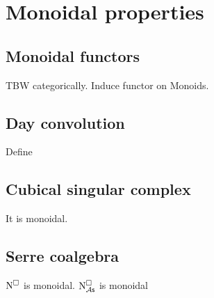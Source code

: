 
\section{Monoidal properties}

\subsection{Monoidal functors}

TBW categorically. Induce functor on Monoids.

\subsection{Day convolution}

Define

\subsection{Cubical singular complex}

It is monoidal.



\subsection{Serre coalgebra}

$\operatorname{N^{\square}}$ is monoidal. $\operatorname{N^{\square}_{\mathcal{A}\mathsf{s}}}$ is monoidal


